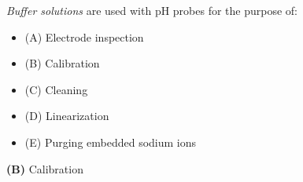 

{\it Buffer solutions} are used with pH probes for the purpose of:

\begin{itemize}
\item{(A)} Electrode inspection
\vskip 5pt 
\item{(B)} Calibration
\vskip 5pt 
\item{(C)} Cleaning
\vskip 5pt 
\item{(D)} Linearization
\vskip 5pt 
\item{(E)} Purging embedded sodium ions
\end{itemize}







{\bf (B)} Calibration
 









